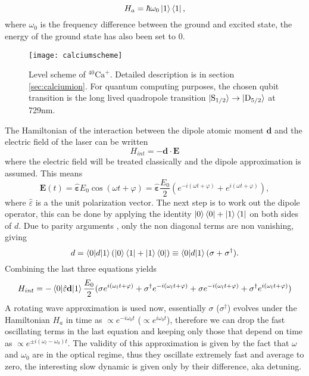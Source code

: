 \begin{equation}
H_a = \hbar\omega_0 \ket{1}\bra{1},
\end{equation}
where $\omega_0$ is the frequency difference between the ground and excited state, the energy of the ground state has also been set to 0. \begin{figure}
\centering
\texttt{[image: calciumscheme]}
\caption{Level scheme of $^{40}\text{Ca}^+$. Detailed description is in section \ref{sec:calciumion}. For quantum computing purposes, the chosen qubit transition is the long lived quadropole transition $\ket{\text{S}_{1/2}} \to \ket{\text{D}_{5/2}}$ at 729nm.}
\label{qubitschemereference}
\end{figure}
The Hamiltonian of the interaction between the dipole atomic moment $\mathbf{d}$ and the electric field of the laser can be written \cite{steck}
\begin{equation}
H_{int} = -\mathbf{d}\cdot \mathbf{E}
\end{equation}
where the electric field will be treated classically and the dipole approximation is assumed. This means
\begin{equation}
\mathbf{E}(t) = \hat{\mathbf{\varepsilon}} E_0 \cos(\omega t+\varphi) = \hat{\mathbf{\varepsilon}} \frac{E_0}{2} \left(e^{-i(\omega t+\varphi)} + e^{i(\omega t+\varphi)}\right),
\end{equation}
where $\hat{\varepsilon}$ is a the unit polarization vector. The next step is to work out the dipole operator, this can be done by applying the identity $\ket{0}\bra{0} + \ket{1}\bra{1}$ on both sides of $d$. Due to parity arguments \cite{steck}, only the non diagonal terms are non vanishing, giving
\begin{equation}
d = \braket{0|d|1}\left(\ket{0}\bra{1} + \ket{1}\bra{0}\right) \equiv \braket{0|d|1}(\sigma + \sigma^\dagger).
\end{equation}
Combining the last three equations yields
\begin{equation}
H_{int} = - \braket{0|\hat{\varepsilon} \mathbf{d}|1}\frac{E_0}{2}(\sigma e^{i(\omega_l t+\varphi)} + \sigma^\dagger e^{-i(\omega_l t+\varphi)} + \sigma e^{-i(\omega_l t+\varphi)} + \sigma^\dagger e^{i(\omega_l t+\varphi)})
\end{equation}
A rotating wave approximation is used now, essentially $\sigma$ ($\sigma^\dagger$) evolves under the Hamiltonian $H_a$ in time as $\propto e^{-i\omega_0 t}$ ($\propto e^{i\omega_0 t}$), therefore we can drop the fast oscillating terms in the last equation and keeping only those that depend on time as $\propto e^{\pm i(\omega_l-\omega_0 )t}$. The validity of this approximation is given by the fact that $\omega$ and $\omega_0$ are in the optical regime, thus they oscillate extremely fast and average to zero, the interesting slow dynamic is given only by their difference, aka detuning.
